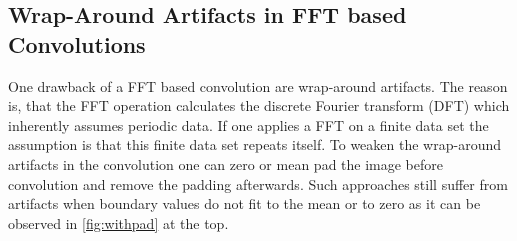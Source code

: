 \documentclass{juliacon}
\begin{document}
\subsection{Wrap-Around Artifacts in FFT based Convolutions}
    One drawback of a FFT based convolution are wrap-around artifacts. The reason is, that the FFT operation calculates the discrete
    Fourier transform (DFT) which inherently assumes periodic data. If one applies a FFT on a finite data set the assumption is that
    this finite data set repeats itself. 
    To weaken the wrap-around artifacts in the convolution one can zero or mean pad the image before convolution 
    and remove the padding afterwards. Such approaches still suffer from artifacts when boundary values do not fit
    to the mean or to zero as it can be observed in \autoref{fig:withpad} at the top.
    \begin{figure}[h]
        \centering
        \begin{subfigure}[b]{.25\textwidth}
            \centering
\end{subfigure}
\end{figure}
\end{document}
